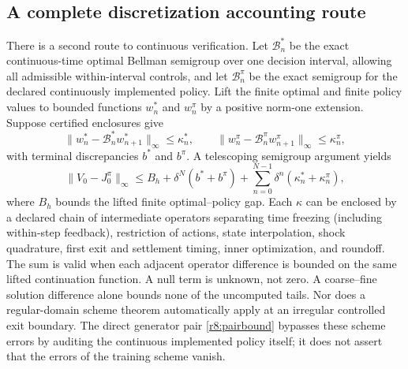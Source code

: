 \subsection{A complete discretization accounting route}\label{r8:decomposition}
There is a second route to continuous verification. Let $\mathcal B_n^*$ be the exact continuous-time optimal Bellman semigroup over one decision interval, allowing all admissible within-interval controls, and let $\mathcal B_n^\pi$ be the exact semigroup for the declared continuously implemented policy. Lift the finite optimal and finite policy values to bounded functions $w_n^*$ and $w_n^\pi$ by a positive norm-one extension. Suppose certified enclosures give
\[
 \|w_n^*-\mathcal B_n^*w_{n+1}^*\|_\infty\leq\kappa_n^*,\qquad
 \|w_n^\pi-\mathcal B_n^\pi w_{n+1}^\pi\|_\infty\leq\kappa_n^\pi,
\]
with terminal discrepancies $b^*$ and $b^\pi$. A telescoping semigroup argument yields
\begin{equation}
 \|V_0-J_0^\pi\|_\infty\leq B_h+
 \delta^N(b^*+b^\pi)+\sum_{n=0}^{N-1}\delta^n(\kappa_n^*+\kappa_n^\pi),\label{r8:totalbudget}
\end{equation}
where $B_h$ bounds the lifted finite optimal--policy gap.
Each $\kappa$ can be enclosed by a declared chain of intermediate operators separating time freezing (including within-step feedback), restriction of actions, state interpolation, shock quadrature, first exit and settlement timing, inner optimization, and roundoff. The sum is valid when each adjacent operator difference is bounded on the same lifted continuation function. A null term is unknown, not zero. A coarse--fine solution difference alone bounds none of the uncomputed tails. Nor does a regular-domain scheme theorem automatically apply at an irregular controlled exit boundary. The direct generator pair \eqref{r8:pairbound} bypasses these scheme errors by auditing the continuous implemented policy itself; it does not assert that the errors of the training scheme vanish.

